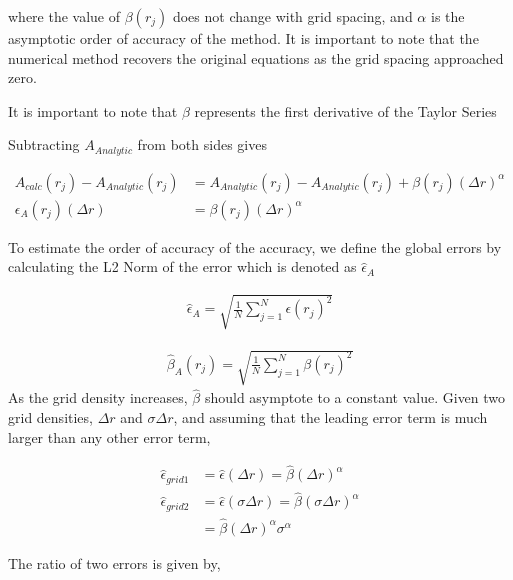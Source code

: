 where the value of $\beta(r_j)$ does not change with grid spacing, and 
$\alpha$ is the asymptotic order of accuracy of the method. It is important to
note that the numerical method recovers the original equations as the grid 
spacing approached zero. 

It is important to note that $\beta$ represents the first derivative of the 
Taylor Series

Subtracting $A_{Analytic}$ from both sides gives

\begin{align*}
    A_{calc}(r_j) - A_{Analytic}(r_j) &= A_{Analytic}(r_j) - A_{Analytic}(r_j)
    + \beta(r_j) (\Delta r)^{\alpha} \\
    \epsilon_A(r_j)(\Delta r) &= \beta(r_j) (\Delta r)^{\alpha}
\end{align*}

To estimate the order of accuracy of the accuracy, we define the global errors 
by calculating the L2 Norm of the error which is denoted as $\hat{\epsilon}_A$ 


\begin{align*}
    \hat{\epsilon}_A = \sqrt{\frac{1}{N}\sum_{j=1}^{N} \epsilon(r_j)^2  }
\end{align*}

\begin{align*}
    \hat{\beta}_A(r_j) = \sqrt{\frac{1}{N}\sum_{j=1}^{N} \beta(r_j)^2  }
\end{align*}
As the grid density increases, $\hat{\beta}$ should asymptote to a constant 
value. Given two grid densities, $\Delta r$ and $\sigma\Delta r$, and assuming
that the leading error term is much larger than any other error term,

\begin{align*}
    \hat{\epsilon}_{grid 1} &= \hat{\epsilon}(\Delta r) = \hat{\beta}(\Delta r)^{\alpha} \\
    \hat{\epsilon}_{grid 2} &= \hat{\epsilon}(\sigma \Delta r) = \hat{\beta}(\sigma \Delta r)^{\alpha} \\
                            &= \hat{\beta}(\Delta r)^{\alpha} \sigma^{\alpha}
\end{align*}

The ratio of two errors is given by,

